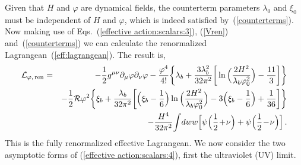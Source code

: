 Given that $H$ and $\varphi$ are dynamical fields, the counterterm parameters
$\lambda_0$ and $\xi_0$ must be independent of $H$ and $\varphi$,
which is indeed satisfied by~(\ref{counterterms}).
 Now making use of Eqs.~(\ref{effective action:scalars:3}),
(\ref{Vren}) and~(\ref{counterterms}) we can calculate the renormalized
Lagrangean~(\ref{eff:lagrangean}). The result is,
\begin{eqnarray}
 {\cal L}_{\varphi,\, \mathrm{ren}}
  &=& -\frac12g^{\mu\nu}\partial_\mu\varphi\partial_\nu\varphi
      - \frac{\varphi^4}{4!}\bigg\{\lambda_b+\frac{3\lambda_b^{2}}{32\pi^{2}}
      \bigg[\ln\Big(\frac{2H^{2}}{\lambda_b\varphi_0^{2}}\Big)-\frac{11}{3}\bigg]\bigg\}
\nonumber\\
  & &    - \frac12{\cal R}\varphi^2\bigg\{\xi_b+\frac{\lambda_b}{32\pi^{2}}\bigg[\Big(\xi_b-\frac{1}{6}\Big)
                       \ln\Big(\frac{2H^{2}}{\lambda_b\varphi_0^{2}}\Big)
                       -3\Big(\xi_b-\frac{1}{6}\Big)+\frac{1}{36}\bigg]\bigg\}
\nonumber
\\
&&\hskip 0.cm
     - \frac{H^4}{32\pi^2}
        \!\int\! dww
              \Big[\psi\Big(\frac{1}{2}\!+\!\nu\Big)
                              + \psi\Big(\frac{1}{2}\!-\!\nu\Big)\Big]
\,.
\label{effective action:scalars:4}
\end{eqnarray}
This is the fully renormalized effective Lagrangean. We now
consider the two asymptotic forms of (\ref{effective
action:scalars:4}), first the ultraviolet (UV) limit.

